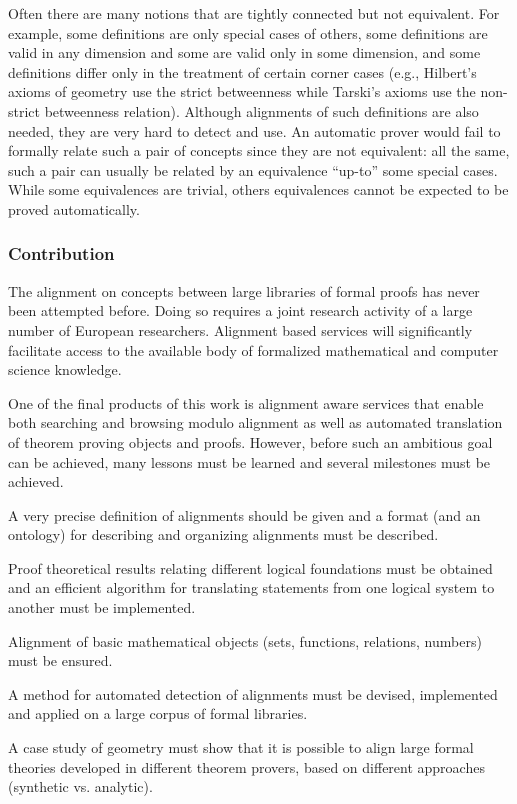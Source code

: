 Often there are many notions that are tightly connected but not
equivalent.
%
For example, some definitions are only special cases of others,
some definitions are valid in any dimension and some
are valid only in some dimension, and some definitions differ
only in the treatment of certain corner cases (e.g., Hilbert's axioms of
geometry use the strict betweenness while Tarski's axioms use the
non-strict betweenness relation).  Although alignments of such
definitions are also needed, they are very hard to detect and use. An
automatic prover would fail to formally relate such a pair of concepts
since they are not equivalent: all the same, such a pair can usually
be related by an equivalence ``up-to'' some special cases.  While some
equivalences are trivial, others equivalences cannot be expected to be
proved automatically.

\subsubsection*{Contribution}

The alignment on concepts between large libraries of formal proofs has
never been attempted before.  Doing so requires a joint research
activity of a large number of European researchers.  Alignment based
services will significantly
facilitate access to the available body of formalized mathematical and
computer science knowledge.

One of the final products of this work is alignment aware services
that enable both searching and browsing modulo alignment as well as
automated translation of theorem proving objects and proofs.  However,
before such an ambitious goal can be achieved, many lessons must be
learned and several milestones must be achieved.
\begin{compactitem}
\item A very precise definition of alignments should be given and a
  format (and an ontology) for describing and organizing alignments
  must be described.
\item Proof theoretical results relating different logical foundations
  must be obtained and an efficient algorithm for translating
  statements from one logical system to another must be implemented.
\item Alignment of basic mathematical objects (sets, functions,
  relations, numbers) must be ensured.
\item A method for automated detection of alignments must be devised,
  implemented and applied on a large corpus of formal libraries.
\item A case study of geometry must show that it is possible to align
  large formal theories developed in different theorem provers, based
  on different approaches (synthetic vs. analytic).
\end{compactitem}

